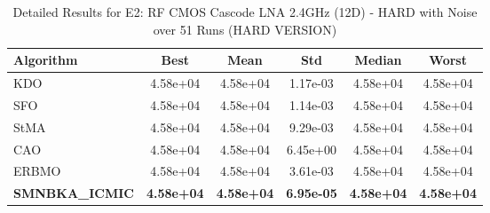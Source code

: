\begin{table}[htbp]
\centering
\caption{Detailed Results for E2: RF CMOS Cascode LNA 2.4GHz (12D) - HARD with Noise over 51 Runs (HARD VERSION)}
\label{tab:P2_detailed}
\small
\begin{tabular}{lccccc}
\toprule
\textbf{Algorithm} & \textbf{Best} & \textbf{Mean} & \textbf{Std} & \textbf{Median} & \textbf{Worst} \\
\midrule
KDO & 4.58e+04 & 4.58e+04 & 1.17e-03 & 4.58e+04 & 4.58e+04 \\
SFO & 4.58e+04 & 4.58e+04 & 1.14e-03 & 4.58e+04 & 4.58e+04 \\
StMA & 4.58e+04 & 4.58e+04 & 9.29e-03 & 4.58e+04 & 4.58e+04 \\
CAO & 4.58e+04 & 4.58e+04 & 6.45e+00 & 4.58e+04 & 4.58e+04 \\
ERBMO & 4.58e+04 & 4.58e+04 & 3.61e-03 & 4.58e+04 & 4.58e+04 \\
\textbf{SMNBKA_ICMIC} & \textbf{4.58e+04} & \textbf{4.58e+04} & \textbf{6.95e-05} & \textbf{4.58e+04} & \textbf{4.58e+04} \\
\bottomrule
\end{tabular}
\end{table}
